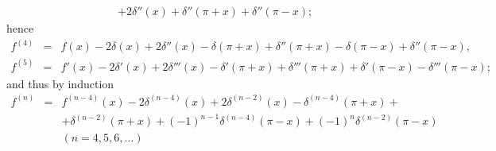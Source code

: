 {\begin{enumerate}
\begin{eqnarray*}
           &    &+2\delta''(x)+\delta''(\pi+x)+\delta''(\pi-x);
\end{eqnarray*}
hence
\begin{eqnarray*}
   f^{(4)}   &=   &f(x)-2\delta(x)+2\delta''(x)-
             \delta(\pi+x)+\delta''(\pi+x)-\delta(\pi-x)+\delta''(\pi-x), \\
   f^{(5)}   &=   &f'(x)-2\delta'(x)+2\delta'''(x)-
             \delta'(\pi + x)+\delta'''(\pi + x)+\delta'(\pi - x)-
             \delta'''(\pi - x);
\end{eqnarray*}
and thus  by induction
\begin{eqnarray*}
 f^{(n)}&=&f^{(n-4)}(x)-2\delta^{(n-4)}(x)+
             2\delta^{(n-2)}(x)-\delta^{(n-4)}(\pi+x)+\\
   &&+\delta^{(n-2)}(\pi+x)+(-1)^{n-1}
             \delta^{(n-4)}(\pi-x)+(-1)^n\delta^{(n-2)}(\pi-x)\\
   &&(n=4,5,6,\dots)
\end{eqnarray*}



\end{enumerate}

\eexample
}


\begin{center}
{\color{olive}   \Huge
\floweroneleft
}
\end{center}
